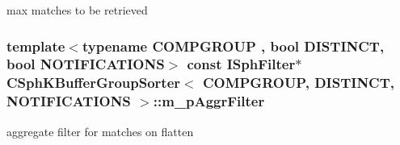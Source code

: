 max matches to be retrieved 

\hypertarget{classCSphKBufferGroupSorter_a6c3ed879d55381387f0258f439849e1d}{
\subsubsection[{m\-\_\-p\-Aggr\-Filter}]{\setlength{\rightskip}{0pt plus 5cm}template$<$typename C\-O\-M\-P\-G\-R\-O\-U\-P , bool D\-I\-S\-T\-I\-N\-C\-T, bool N\-O\-T\-I\-F\-I\-C\-A\-T\-I\-O\-N\-S$>$ const {\bf I\-Sph\-Filter}$\ast$ {\bf C\-Sph\-K\-Buffer\-Group\-Sorter}$<$ C\-O\-M\-P\-G\-R\-O\-U\-P, D\-I\-S\-T\-I\-N\-C\-T, N\-O\-T\-I\-F\-I\-C\-A\-T\-I\-O\-N\-S $>$\-::m\-\_\-p\-Aggr\-Filter\hspace{0.3cm}{\ttfamily [protected]}}}\label{classCSphKBufferGroupSorter_a6c3ed879d55381387f0258f439849e1d}


aggregate filter for matches on flatten 

